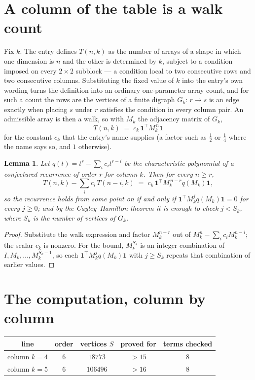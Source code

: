 \documentclass[11pt,a4paper]{article}
\theoremstyle{plain}
\newtheorem{lemma}[theorem]{Lemma}
\theoremstyle{definition}
\begin{document}
\section{A column of the table is a walk count}

Fix $k$. The entry defines $T(n,k)$ as the number of arrays of a shape in which one dimension
is $n$ and the other is determined by $k$, subject to a condition imposed on every
$2\times2$ subblock --- a condition local to two consecutive rows and two consecutive columns.
Substituting the fixed value of $k$ into the entry's own wording turns the definition into an
ordinary one-parameter array count, and for such a count the rows are the vertices of a finite
digraph $G_k$: $r\to s$ is an edge exactly when placing $s$ under $r$ satisfies the condition
in every column pair. An admissible array is then a walk, so with $M_k$ the adjacency matrix
of $G_k$,
\[
T(n,k)\;=\;c_k\,\mathbf{1}^{\!\top}M_k^{\,n}\mathbf{1}
\]
for the constant $c_k$ that the entry's name supplies (a factor such as $\tfrac12$ or
$\tfrac14$ where the name says so, and $1$ otherwise).

\begin{lemma}\label{lem:crit}
Let $q(t)=t^{r}-\sum_i c_it^{r-i}$ be the characteristic polynomial of a conjectured
recurrence of order $r$ for column $k$. Then for every $n\ge r$,
\[
T(n,k)-\sum_i c_i\,T(n-i,k)\;=\;c_k\,\mathbf{1}^{\!\top}M_k^{\,n-r}q(M_k)\mathbf{1},
\]
so the recurrence holds from some point on if and only if
$\mathbf{1}^{\!\top}M_k^{j}q(M_k)\mathbf{1}=0$ for every $j\ge0$; and by the
Cayley--Hamilton theorem it is enough to check $j<S_k$, where $S_k$ is the number of vertices
of $G_k$.
\end{lemma}

\begin{proof}
Substitute the walk expression and factor $M_k^{n-r}$ out of $M_k^{n}-\sum_ic_iM_k^{n-i}$;
the scalar $c_k$ is nonzero. For the bound, $M_k^{S_k}$ is an integer combination of
$I,M_k,\dots,M_k^{S_k-1}$, so each $\mathbf{1}^{\!\top}M_k^{j}q(M_k)\mathbf{1}$ with
$j\ge S_k$ repeats that combination of earlier values.
\end{proof}

\section{The computation, column by column}

\begin{center}
\begin{tabular}{ccccc}
line & order & vertices $S$ & proved for & terms checked \\ \hline
column $k$$=4$ & $6$ & $18773$ & $>15$ & $8$ \\
column $k$$=5$ & $6$ & $106496$ & $>16$ & $8$ \\
\end{tabular}
\end{center}
\end{document}
